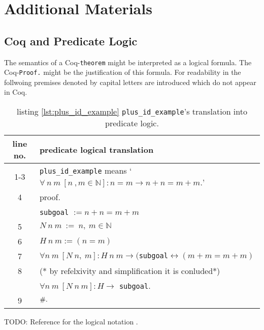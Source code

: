 \section{Additional Materials}\label{app:AdditionalMaterials}

\subsection{Coq and Predicate Logic} \label{subsec:CoqAndPredicateLogic}
	The semantics of a Coq-\lstinline!theorem! might be interpreted as a logical formula.
	The Coq-\lstinline!Proof.! might be the justification of this formula. 
	For readability in the follwoing premises denoted by capital letters are introduced which do not appear in Coq.
	\begin{table}[h]
		\begin{center}
			\begin{tabular}{|c|l|}
			    \hline
	 			line no.  &  predicate logical translation \\  \hline
		     	  1-3    %
		                  & \lstinline!plus_id_example! means `$ \forall\ n\ m\ [n\ , m \in \mathbb{N}]: n = m \rightarrow n+n = m+m.$'\\ \hline        
		     	  4       & proof. \\     	     	      	                      
		                  &  \lstinline!subgoal! $:= n+n = m+m$    \\ \hline
		          5       &   $N \ n \ m \ := \ n,\ m \in \mathbb{N}$       \\ \hline       
		          6       &   $ H\ n\ m :=( n= m)$ \\        
		    	      7       &   $ \forall n \ m\ [N \ n,\ m]: H\ n\ m \rightarrow ($\lstinline!subgoal!$\leftrightarrow( m+m = m+m)$\\   \hline 
		          8       &   (* by refelxivity and simplification it is conluded*) \\
		                  & $\forall n\ m\ [ N\ n\ m]: H \rightarrow$ \lstinline!subgoal!.  \\  \hline
		          9       & $\qed.$\\ \hline        	          
	        		\end{tabular}
		\end{center}
		\label{tab:CoqAndPreciateLogic}
		\caption{listing \ref{lst:plus_id_example} \lstinline!plus_id_example!'s translation into predicate logic.} 
	\end{table}

TODO: Reference for the logical notation .